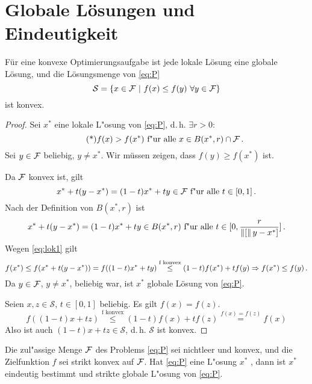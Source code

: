 \section{Globale Lösungen und Eindeutigkeit}

\begin{Satz}
F\"ur eine konvexe Optimierungsaufgabe ist jede lokale L\"osung eine globale L\"osung, und die L\"osungsmenge von \eqref{eq:P}
\begin{equation*}
	\mathcal{S}=\{ x\in\mathcal{F} ~\vert~ f(x)\leq f(y)~\forall y\in\mathcal{F}\}
\end{equation*}
ist konvex.
\end{Satz}

\begin{proof}
Sei $x^*$ eine lokale L"osung von \eqref{eq:P}, d.\,h. $\exists r > 0$:
\begin{equation}
 \label{eq:lok1}
 \tag{*}
f(x)>f(x^*) \text{ f"ur alle } x \in B(x^*,r) \cap \mathcal{F} \,.
\end{equation}
Sei $y \in \mathcal{F}$ beliebig, $y \neq x^*$. Wir müssen zeigen, dass $f(y)\geq f(x^*)$ ist.

Da $\mathcal{F}$ konvex ist, gilt 
\begin{equation}
x^*+t(y-x^*)= (1-t) x^* + ty \in \mathcal{F} \text{ f"ur alle }  t \in [0,1] \,.
\end{equation}
Nach der Definition von $B(x^*,r)$ ist
\begin{equation*}
x^*+t(y-x^*)= (1-t) x^* + ty \in B(x^*,r) \text{ f"ur alle }  t \in [0,\frac{r}{\left\lVert[\right\rVert y-x^*]}] \,.
\end{equation*}
Wegen \eqref{eq:lok1} gilt
\begin{equation*}
f(x^*)\leq f(x^*+t(y-x^*))=f((1-t)x^*+ty)\overset{\text{f konvex}}{\leq} (1-t)f(x^*)+tf(y) \\
\Rightarrow f(x^*)\leq f(y) \,.
\end{equation*}
Da $y\in \mathcal{F}$, $y \neq x^*$, beliebig war, ist $x^*$ globale Lösung von \eqref{eq:P}.

Seien $x,z \in \mathcal{S}$, $t \in [0,1]$ beliebig.
Es gilt $f(x)=f(z)$.
\begin{equation*}
f((1-t)x+tz)\overset{\text{f konvex}}{\leq} (1-t)f(x)+tf(z)\overset{f(x)=f(z)}{=} f(x)
\end{equation*}
Also ist auch $(1-t)x+tz \in \mathcal{S}$, d.\,h. $\mathcal{S}$ ist konvex.
\end{proof}

\begin{Satz}
Die zul"assige Menge $\mathcal{F}$ des Problems \eqref{eq:P} sei nichtleer und konvex, und die Zielfunktion $f$ sei strikt konvex auf $\mathcal{F}$. Hat \eqref{eq:P} eine L"osung $x^*$ , dann ist $x^*$ eindeutig bestimmt und strikte globale L"osung von \eqref{eq:P}.
\end{Satz}

